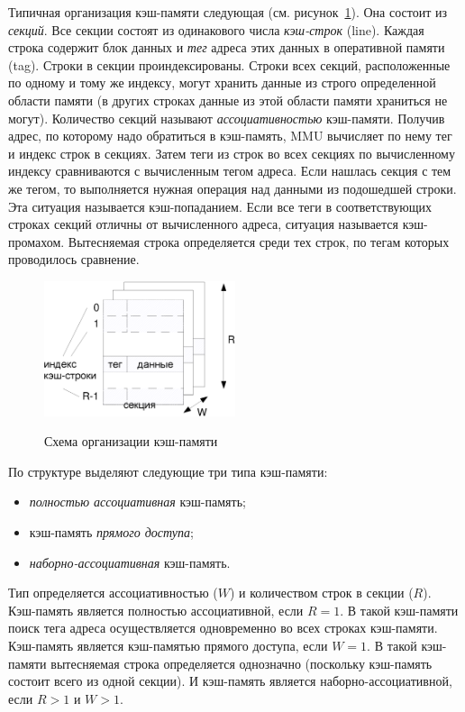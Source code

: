 Типичная организация кэш-памяти следующая (см. рисунок~\ref{fig:cache_model}). Она состоит из \emph{секций}. Все секции состоят из одинакового числа \emph{кэш-строк} (line). Каждая строка содержит блок данных и \emph{тег} адреса этих данных в оперативной памяти (tag). Строки в секции проиндексированы. Строки всех секций, расположенные по одному и тому же индексу, могут хранить данные из строго определенной области памяти (в других строках данные из этой области памяти храниться не могут). Количество секций называют \emph{ассоциативностью} кэш-памяти. Получив адрес, по которому надо обратиться в кэш-память, MMU вычисляет по нему тег и индекс строк в секциях. Затем теги из строк во всех секциях по вычисленному индексу сравниваются с вычисленным тегом адреса. Если нашлась секция с тем же тегом, то выполняется нужная операция над данными из подошедшей строки. Эта ситуация называется кэш-попаданием. Если все теги в соответствующих строках секций отличны от вычисленного адреса, ситуация называется кэш-промахом. Вытесняемая строка определяется среди тех строк, по тегам которых проводилось сравнение.

\begin{figure}[h] \center
  \includegraphics[width=0.5\textwidth]{1.review/cache}\\
  \caption{Схема организации кэш-памяти}\label{fig:cache_model}
\end{figure}

По структуре выделяют следующие три типа кэш-памяти:
\begin{itemize}
   \item \emph{полностью ассоциативная} кэш-память;
   \item кэш-память \emph{прямого доступа};
   \item \emph{наборно-ассоциативная} кэш-память.
\end{itemize}
Тип определяется ассоциативностью ($W$) и количеством строк в секции ($R$). Кэш-память является полностью ассоциативной, если $R = 1$. В такой кэш-памяти поиск тега адреса осуществляется одновременно во всех строках кэш-памяти. Кэш-память является кэш-памятью прямого доступа, если $W = 1$. В такой кэш-памяти вытесняемая строка определяется однозначно (поскольку кэш-память состоит всего из одной секции). И кэш-память является наборно-ассоциативной, если $R > 1$ и $W > 1$.

